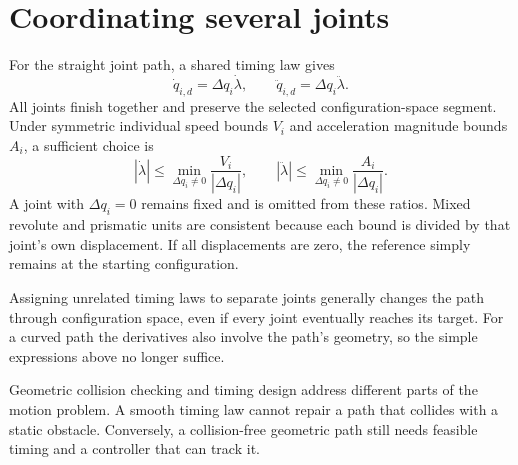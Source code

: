 \section{Coordinating several joints}
For the straight joint path, a shared timing law gives
\begin{equation}
 \dot q_{i,d}=\Delta q_i\dot\lambda,\qquad
 \ddot q_{i,d}=\Delta q_i\ddot\lambda.
 \label{eq:l12-shared}
\end{equation}
All joints finish together and preserve the selected configuration-space
segment. Under symmetric individual speed bounds $V_i$ and acceleration
magnitude bounds $A_i$, a sufficient choice is
\[
 |\dot\lambda|\le\min_{\Delta q_i\ne0}\frac{V_i}{|\Delta q_i|},\qquad
 |\ddot\lambda|\le\min_{\Delta q_i\ne0}\frac{A_i}{|\Delta q_i|}.
\]
A joint with $\Delta q_i=0$ remains fixed and is omitted from these ratios.
Mixed revolute and prismatic units are consistent because each bound is
divided by that joint's own displacement. If all displacements are zero,
the reference simply remains at the starting configuration.

Assigning unrelated timing laws to separate joints generally changes the
path through configuration space, even if every joint eventually reaches
its target. For a curved path the derivatives also involve the path's
geometry, so the simple expressions above no longer suffice.

Geometric collision checking and timing design address different parts
of the motion problem. A smooth timing law cannot repair a path that
collides with a static obstacle. Conversely, a collision-free geometric
path still needs feasible timing and a controller that can track it.

\clearpage
